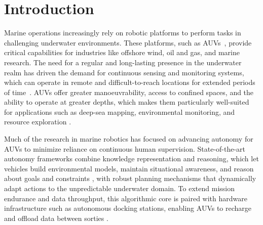 \documentclass[journal]{IEEEtran}
\begin{document}
\section{Introduction}

Marine operations increasingly rely on robotic platforms to perform tasks in challenging underwater environments. These platforms, such as \acp{AUV}~\cite{ROVsToAUVs, 6093749}, provide critical capabilities for industries like offshore wind, oil and gas, and marine research. The need for a regular and long-lasting presence in the underwater realm has driven the demand for continuous sensing and monitoring systems, which can operate in remote and difficult-to-reach locations for extended periods of time~\cite{ROVsToAUVs}. AUVs offer greater manoeuvrability, access to confined spaces, and the ability to operate at greater depths, which makes them particularly well-suited for applications such as deep-sea mapping, environmental monitoring, and resource exploration \cite{9463768}. 


Much of the research in marine robotics has focused on advancing autonomy for AUVs to minimize reliance on continuous human supervision. State-of-the-art autonomy frameworks combine knowledge representation and reasoning, which let vehicles build environmental models, maintain situational awareness, and reason about goals and constraints \cite{maurelli2014cognitive, insaurralde2015capability}, with robust planning mechanisms that dynamically adapt actions to the unpredictable underwater domain. To extend mission endurance and data throughput, this algorithmic core is paired with hardware infrastructure such as autonomous docking stations, enabling AUVs to recharge and offload data between sorties \cite{PALOMERAS2018106,9440960}.
\end{document}
